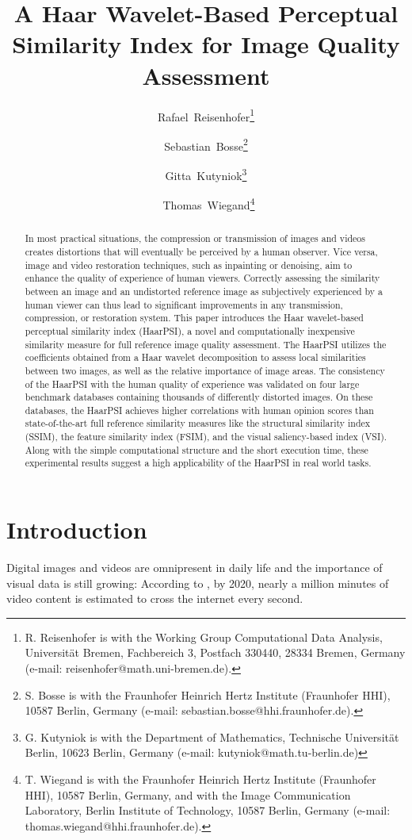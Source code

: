 \documentclass[11pt,a4paper]{article}
\title{A Haar Wavelet-Based Perceptual Similarity Index for Image Quality Assessment}
\author{Rafael~Reisenhofer\thanks{R. Reisenhofer is with the Working Group Computational Data Analysis, Universit\"at Bremen, Fachbereich 3, Postfach 330440, 28334 Bremen, Germany (e-mail: reisenhofer@math.uni-bremen.de).}
\and Sebastian~Bosse\thanks{S. Bosse is with the Fraunhofer Heinrich Hertz Institute (Fraunhofer HHI), 10587 Berlin, Germany (e-mail: sebastian.bosse@hhi.fraunhofer.de).} \and Gitta~Kutyniok\thanks{G. Kutyniok is with the Department of Mathematics, Technische Universit\"at Berlin, 10623 Berlin, Germany (e-mail: kutyniok@math.tu-berlin.de)}\and~Thomas~Wiegand\thanks{T. Wiegand is with the Fraunhofer Heinrich Hertz Institute
(Fraunhofer HHI), 10587 Berlin, Germany, and with the Image Communication Laboratory, Berlin Institute of Technology,
10587 Berlin, Germany (e-mail: thomas.wiegand@hhi.fraunhofer.de).}}
\date{}
\begin{document}
\maketitle


\begin{abstract}
In most practical situations, the compression or transmission of images and videos creates distortions that will eventually be perceived by a human observer. Vice versa, image and video restoration techniques, such as inpainting or denoising, aim to enhance the quality of experience of human viewers. Correctly assessing the similarity between an image and an undistorted reference image as subjectively experienced by a human viewer can thus lead to significant improvements in any transmission, compression, or restoration system. This paper introduces the Haar wavelet-based perceptual similarity index (HaarPSI), a novel and computationally inexpensive similarity measure for full reference image quality assessment. The HaarPSI utilizes the coefficients obtained from a Haar wavelet decomposition to assess local similarities between two images, as well as the relative importance of image areas. The consistency of the HaarPSI with the human quality of experience was validated on four large benchmark databases containing thousands of differently distorted images. On these databases, the HaarPSI achieves higher correlations with human opinion scores than state-of-the-art full reference similarity measures like the structural similarity index (SSIM), the feature similarity index (FSIM), and the visual saliency-based index (VSI). Along with the simple computational structure and the short execution time, these experimental results suggest a high applicability of the HaarPSI in real world tasks.
\end{abstract}




\section{Introduction}
\label{sec:intro}
Digital images and videos are omnipresent in daily life and the importance of
visual data is still growing: According to \cite{Cisco}, by 2020, nearly a million
minutes of video content is estimated to cross the internet every second.
\end{document}
